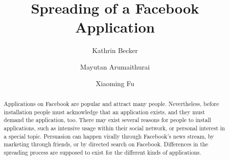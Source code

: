 \documentclass[preprint,12pt]{elsarticle}
\begin{document}
\begin{frontmatter}



\title{Spreading of a Facebook Application}



\author[focal]{Kathrin Becker} 
\author[focal]{Mayutan Arumaithurai} %
\author[focal]{Xiaoming Fu} %

\address[focal]{Institute of Computer Science, Computer Networks (NET)
  Research Group, University of G\"ottingen}








\begin{abstract}
Applications on Facebook are popular and attract many
people. Nevertheless, before installation people must acknowledge that an application
exists, and they must demand the application, too.
There may exist several reasons for people to install
applications, such as intensive usage within their social network, or
personal interest in a special topic. Persuasion can
happen virally through Facebook's news stream, by marketing through
friends, or by directed search on 
Facebook. Differences in the spreading process are supposed to exist
for the different kinds of applications. 


\end{abstract}
\end{frontmatter}
\end{document}
